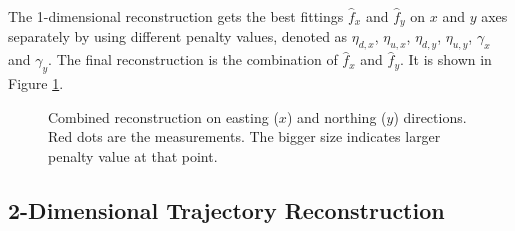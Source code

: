 The 1-dimensional reconstruction gets the best fittings $\hat{f}_x$ and $\hat{f}_y$ on $x$ and $y$ axes separately by using different penalty values, denoted as $\eta_{d,x}$, $\eta_{u,x}$, $\eta_{d,y}$, $\eta_{u,y}$, $\gamma_x$ and $\gamma_y$. The final reconstruction is the combination of  $\hat{f}_x$ and $\hat{f}_y$. It is shown in Figure \ref{1DCombinedXY}. 
\begin{figure}[h!]
  \centering
\caption{Combined reconstruction on easting ($x$) and northing ($y$) directions. Red dots are the measurements. The bigger size indicates larger penalty value at that point. }\label{1DCombinedXY}
\end{figure}





\subsection{2-Dimensional Trajectory Reconstruction}

